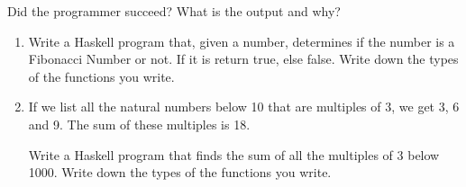 \documentclass [11pt, a4wide, twoside]{article}
\begin{document}
\begin{myenumerate}
\item Did the programmer succeed? What is the output and why?
\end{myenumerate}




\newpage

\noindent
%
\begin{enumerate}
\item Write a Haskell program that, given a number, determines if the number is a Fibonacci Number or not. If it is return true, else false. Write down the types of the functions you write.
\vspace{9cm}
\item If we list all the natural numbers below 10 that are multiples of 3, we get 3, 6 and 9. The sum of these multiples is 18.

Write a Haskell program that finds the sum of all the multiples of 3 below 1000. Write down the types of the functions you write.
\vspace{6cm}
\end{enumerate}



\newpage
\end{document}
